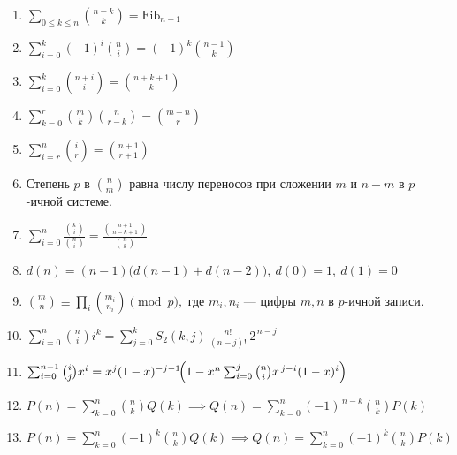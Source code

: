 
\begingroup
\small

\begin{enumerate}
\item %
$\sum_{0\le k\le n}\binom{n-k}{k}=\mathrm{Fib}_{n+1}$

\item %
$\sum_{i=0}^{k}(-1)^i\binom{n}{i}=(-1)^k\binom{n-1}{k}$

\item %
$\sum_{i=0}^{k}\binom{n+i}{i}=\binom{n+k+1}{k}$

\item %
$\sum_{k=0}^{r}\binom{m}{k}\binom{n}{r-k}=\binom{m+n}{r}$

\item %
$\sum_{i=r}^{n}\binom{i}{r}=\binom{n+1}{r+1}$

\item %
Степень $p$ в $\binom{n}{m}$ равна числу переносов при сложении $m$ и $n-m$ в $p$-ичной системе.

\item %
$\sum_{i=0}^{n}\frac{\binom{k}{i}}{\binom{n}{i}}
=\frac{\binom{n+1}{\,n-k+1\,}}{\binom{n}{k}}$

\item %
$d(n)=(n-1)\bigl(d(n-1)+d(n-2)\bigr),\  d(0)=1,\ d(1)=0$

\item %
$\binom{m}{n}\equiv\prod_i\binom{m_i}{n_i}\pmod p,$
\quad где $m_i,n_i$ — цифры $m,n$ в $p$-ичной записи.

\item %
$\sum_{i=0}^{n}\binom{n}{i}i^k
=\sum_{j=0}^{k}S_2(k,j)\,\frac{n!}{(n-j)!}\,2^{\,n-j}$

\item %
$\sum_{i=0}^{n-1}\binom{i}{j}x^i
= x^j(1-x)^{-j-1}\!\Bigl(1-x^n\sum_{i=0}^j\binom{n}{i}x^{\,j-i}(1-x)^i\Bigr)$

\item %
$P(n)=\sum_{k=0}^{n}\binom{n}{k}Q(k) \implies Q(n)=\sum_{k=0}^{n}(-1)^{\,n-k}\binom{n}{k}P(k)$

\item %
$P(n)=\sum_{k=0}^{n}(-1)^k\binom{n}{k}Q(k) \implies Q(n)=\sum_{k=0}^{n}(-1)^k\binom{n}{k}P(k)$


\end{enumerate}
